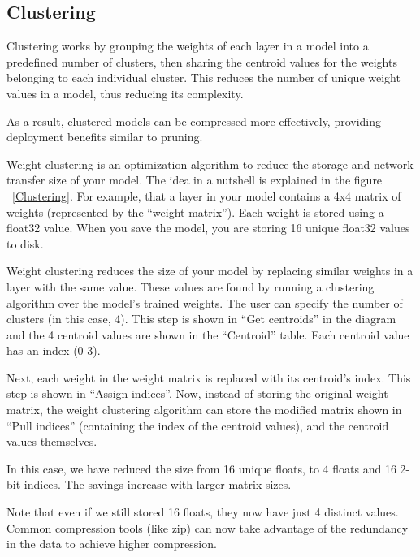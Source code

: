 \subsection{Clustering}
Clustering works by grouping the weights of each layer in a model into a predefined number of clusters, then sharing the centroid values for the weights belonging to each individual cluster. This reduces the number of unique weight values in a model, thus reducing its complexity. \cite{tfl_Opt:2024}

As a result, clustered models can be compressed more effectively, providing deployment benefits similar to pruning.


Weight clustering is an optimization algorithm to reduce the storage and network transfer size of your model. The idea in a nutshell is explained in the figure ~\ref{Clustering}. For example, that a layer in your model contains a 4x4 matrix of weights (represented by the “weight matrix”). Each weight is stored using a float32 value. When you save the model, you are storing 16 unique float32 values to disk.

Weight clustering reduces the size of your model by replacing similar weights in a layer with the same value. These values are found by running a clustering algorithm over the model’s trained weights. The user can specify the number of clusters (in this case, 4). This step is shown in “Get centroids” in the diagram and the 4 centroid values are shown in the “Centroid” table. Each centroid value has an index (0-3).

Next, each weight in the weight matrix is replaced with its centroid’s index. This step is shown in “Assign indices”. Now, instead of storing the original weight matrix, the weight clustering algorithm can store the modified matrix shown in “Pull indices” (containing the index of the centroid values), and the centroid values themselves.

In this case, we have reduced the size from 16 unique floats, to 4 floats and 16 2-bit indices. The savings increase with larger matrix sizes.

Note that even if we still stored 16 floats, they now have just 4 distinct values. Common compression tools (like zip) can now take advantage of the redundancy in the data to achieve higher compression. \cite{tfBlog_ClusteringOpt:2021} \cite{BlogPaperOpt:2017}

